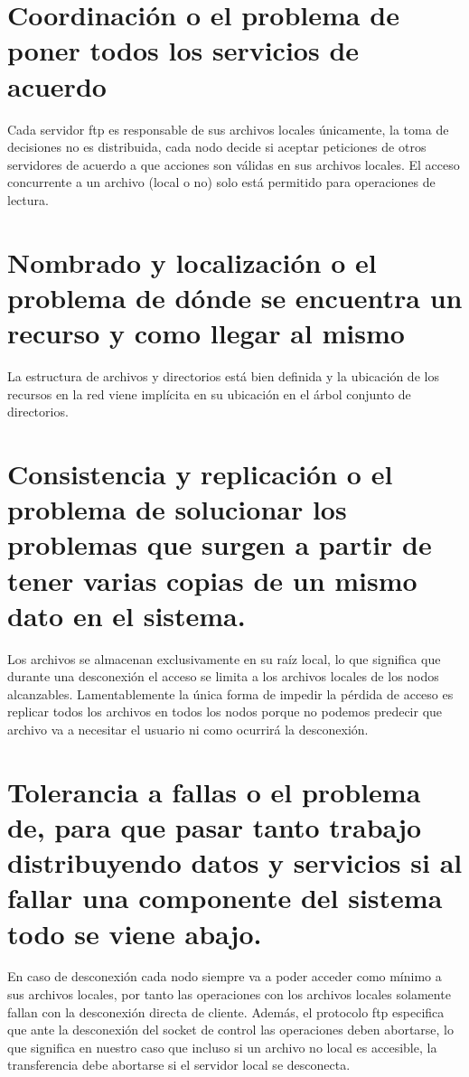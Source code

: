 \documentclass{llncs}
\begin{document}
\section*{Coordinación o el problema de poner todos los servicios de acuerdo}

Cada servidor ftp es responsable de sus archivos locales únicamente, la toma de decisiones no es distribuida, cada nodo
decide si aceptar peticiones de otros servidores de acuerdo a que acciones son válidas en sus archivos locales. El acceso
concurrente a un archivo (local o no) solo está permitido para operaciones de lectura.

\section*{Nombrado y localización o el problema de dónde se encuentra un recurso y como llegar al mismo}

La estructura de archivos y directorios está bien definida y la ubicación de los recursos en la red viene implícita en su ubicación
en el árbol conjunto de directorios.

\section*{Consistencia y replicación o el problema de solucionar los problemas que surgen a partir de tener varias copias de un mismo dato en el sistema.}

Los archivos se almacenan exclusivamente en su raíz local, lo que significa que durante una desconexión el acceso se limita
a los archivos locales de los nodos alcanzables. Lamentablemente la única forma de impedir la pérdida de acceso es replicar
todos los archivos en todos los nodos porque no podemos predecir que archivo va a necesitar el usuario ni como ocurrirá la
desconexión.

\section*{Tolerancia a fallas o el problema de, para que pasar tanto trabajo distribuyendo datos y servicios si al fallar una componente del sistema todo se viene abajo.}

En caso de desconexión cada nodo siempre va a poder acceder como mínimo a sus archivos locales, por tanto las operaciones
con los archivos locales solamente fallan con la desconexión directa de cliente. Además, el protocolo ftp especifica
que ante la desconexión del socket de control las operaciones deben abortarse, lo que significa en nuestro caso que
incluso si un archivo no local es accesible, la transferencia debe abortarse si el servidor local se desconecta.
\end{document}
